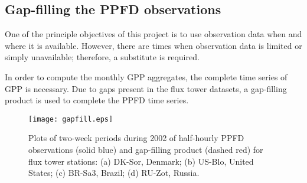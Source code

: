 \subsection{Gap-filling the PPFD observations}
\label{sec:mst2gfppfd}
One of the principle objectives of this project is to use observation data when and where it is available.  
However, there are times when observation data is limited or simply unavailable; therefore, a substitute is required. 

In order to compute the monthly GPP aggregates, the complete time series of GPP is necessary.  
Due to gaps present in the flux tower datasets, a gap-filling product is used to complete the PPFD time series.
\begin{figure}[h!]
    \texttt{[image: gapfill.eps]}
    \caption{Plots of two-week periods during 2002 of half-hourly PPFD 
    observations (solid blue) and gap-filling product (dashed red) for flux 
    tower stations: (a) DK-Sor, Denmark; (b) US-Blo, United States; (c) BR-Sa3, 
    Brazil; (d) RU-Zot, Russia.}
    \label{fig:gapfill}
\end{figure}

